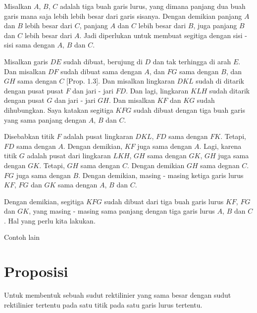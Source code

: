\documentclass[a4paper]{book}
\begin{document}
Misalkan $A$, $B$, $C$ adalah tiga buah garis lurus, yang dimana panjang
dua buah garis mana saja lebih lebih besar dari garis sisanya. Dengan demikian
panjang $A$ dan $B$ lebih besar dari $C$, panjang $A$ dan $C$ lebih besar dari
$B$, juga panjang $B$ dan $C$ lebih besar dari $A$. Jadi diperlukan untuk
membuat segitiga dengan sisi - sisi sama dengan $A$, $B$ dan $C$.

Misalkan garis $DE$ sudah dibuat, berujung di $D$ dan tak terhingga di arah $E$.
Dan misalkan $DF$ sudah dibuat sama dengan $A$, dan $FG$ sama dengan $B$, dan 
$GH$ sama dengan $C$ [Prop. 1.3]. Dan misalkan lingkaran $DKL$ sudah di ditarik
dengan pusat pusat $F$ dan jari - jari $FD$. Dan lagi, lingkaran $KLH$ sudah
ditarik dengan pusat $G$ dan jari - jari $GH$. Dan misalkan $KF$ dan $KG$ sudah
dihubungkan. Saya katakan segitiga $KFG$ sudah dibuat dengan tiga buah
garis yang sama panjang dengan $A$, $B$ dan $C$.

Disebabkan titik $F$ adalah pusat lingkaran $DKL$, $FD$ sama dengan $FK$. 
Tetapi, $FD$ sama dengan $A$. Dengan demikian, $KF$ juga sama dengan $A$. Lagi, 
karena titik $G$ adalah pusat dari lingkaran $LKH$, $GH$ sama dengan $GK$, $GH$
juga sama dengan $GK$. Tetapi, $GH$ sama dengan $C$. Dengan demikian $GH$ sama
degnan $C$. $FG$ juga sama dengan $B$. Dengan demikian, masing - masing 
ketiga garis lurus $KF$, $FG$ dan $GK$ sama dengan  $A$, $B$ dan $C$.

Dengan demikian, segitiga $KFG$ sudah dibuat dari tiga buah garis lurus $KF$, 
$FG$ dan $GK$, yang masing - masing sama panjang dengan tiga garis lurus 
$A$, $B$ dan $C$. Hal yang perlu kita lakukan.


Contoh lain

\begin{center}
\end{center}


\section*{\centering Proposisi \thesection}
Untuk membentuk sebuah sudut rektilinier yang sama besar dengan sudut 
rektilinier tertentu pada satu titik pada satu garis lurus tertentu.
\end{document}
